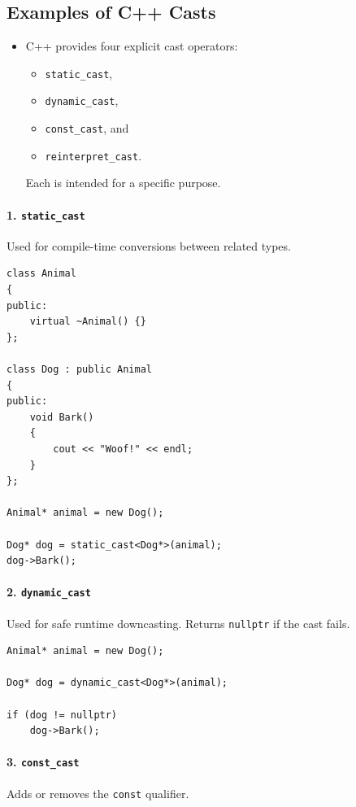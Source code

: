 \documentclass[10pt]{article}
\begin{document}
\newpage
\subsection{Examples of C++ Casts}

\begin{itemize}
    \item C++ provides four explicit cast operators: 
		\begin{itemize}
			\item \verb|static_cast|, 
			\item \verb|dynamic_cast|, 
			\item \verb|const_cast|, and 
			\item \verb|reinterpret_cast|. 		
		\end{itemize}

		Each is intended for a specific purpose.
\end{itemize}

\newpage 
\paragraph{1. \texttt{static\_cast}}
Used for compile-time conversions between related types.

\begin{verbatim}
class Animal
{
public:
    virtual ~Animal() {}
};

class Dog : public Animal
{
public:
    void Bark()
    {
        cout << "Woof!" << endl;
    }
};

Animal* animal = new Dog();

Dog* dog = static_cast<Dog*>(animal);
dog->Bark();
\end{verbatim}

\newpage 

\paragraph{2. \texttt{dynamic\_cast}}
Used for safe runtime downcasting. Returns \verb|nullptr| if the cast fails.

\begin{verbatim}
Animal* animal = new Dog();

Dog* dog = dynamic_cast<Dog*>(animal);

if (dog != nullptr)
    dog->Bark();
\end{verbatim}

\newpage 

\paragraph{3. \texttt{const\_cast}}
Adds or removes the \verb|const| qualifier.
\end{document}
